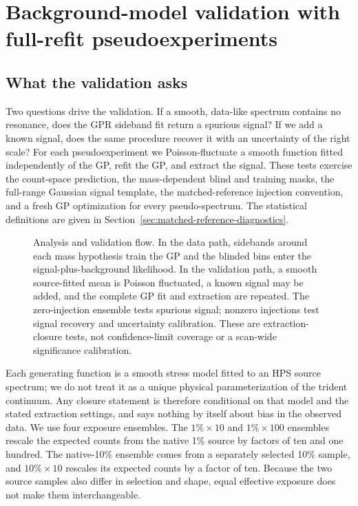 
\section{Background-model validation with full-refit pseudoexperiments}
\label{sec:toys}

\subsection{What the validation asks}

Two questions drive the validation. If a smooth, data-like spectrum contains no
resonance, does the GPR sideband fit return a spurious signal? If we add a known
signal, does the same procedure recover it with an uncertainty of the right scale?
For each pseudoexperiment we Poisson-fluctuate a smooth function fitted independently
of the GP, refit the GP, and extract the signal. These tests exercise the count-space prediction,
the mass-dependent blind and training masks, the full-range Gaussian signal
template, the matched-reference injection convention, and a fresh GP optimization
for every pseudo-spectrum. The statistical definitions are given in
Section~\ref{sec:matched-reference-diagnostics}.

\begin{figure}[htbp]
\centering
{}
\caption{Analysis and validation flow.  In the data path, sidebands around each mass
hypothesis train the GP and the blinded bins enter the signal-plus-background
likelihood.  In the validation path, a smooth source-fitted mean is Poisson
fluctuated, a known signal may be added, and the complete GP fit and extraction are
repeated.  The zero-injection ensemble tests spurious signal; nonzero injections test
signal recovery and uncertainty calibration.  These are extraction-closure tests,
not confidence-limit coverage or a scan-wide significance calibration.}
\label{fig:v491-hps-gpr-flowchart}
\end{figure}

Each generating function is a smooth stress model fitted to an HPS source spectrum;
we do not treat it as a unique physical parameterization of the trident continuum.
Any closure statement is therefore conditional on that model and the stated
extraction settings, and says nothing by itself about bias in the observed data. We
use four exposure ensembles. The
$1\%\times10$ and $1\%\times100$ ensembles rescale the expected counts from the native
1\% source by factors of ten and one hundred. The native-10\% ensemble comes from a
separately selected 10\% sample, and $10\%\times10$ rescales its expected counts by a
factor of ten. Because the two source samples also differ in selection and shape, equal
effective exposure does not make them interchangeable.

